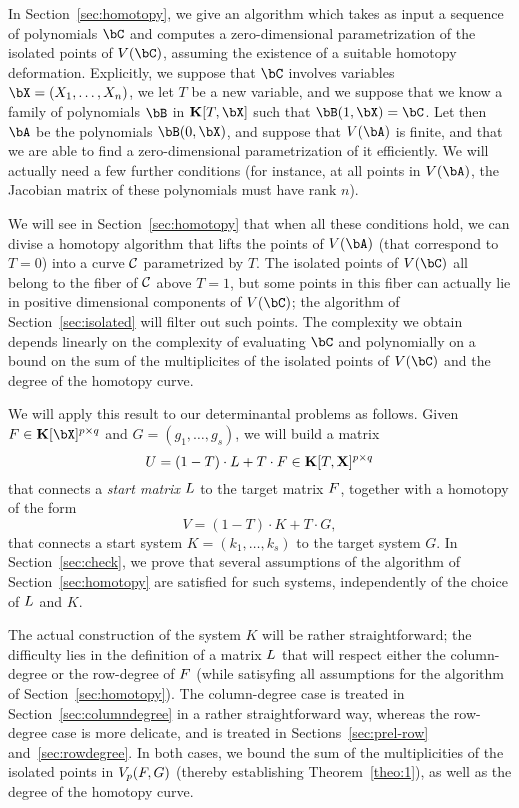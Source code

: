\documentclass[12pt]{article}
\begin{document}
In Section~\ref{sec:homotopy}, we give an algorithm which takes as
input a sequence of polynomials $\bC$ and computes a zero-dimensional
parametrization of the isolated points of $V(\bC)$, assuming the
existence of a suitable homotopy deformation. Explicitly, we suppose
that $\bC$ involves variables $\bX=(X_1,\dots,X_n)$, we let $T$ be a
new variable, and we suppose that we know a family of polynomials
$\bB$ in $\KK[T,\bX]$ such that $\bB(1,\bX)=\bC$. Let then $\bA$ be
the polynomials $\bB(0,\bX)$, and suppose that $V(\bA)$ is finite, and
that we are able to find a zero-dimensional parametrization of it
efficiently. We will actually need a few further conditions (for
instance, at all points in $V(\bA)$, the Jacobian matrix of these
polynomials must have rank $n$).

We will see in Section~\ref{sec:homotopy} that when all these
conditions hold, we can divise a homotopy algorithm that lifts the
points of $V(\bA)$ (that correspond to $T=0$) into a curve $\cal C$
parametrized by $T$. The isolated points of $V(\bC)$ all belong to the
fiber of $\cal C$ above $T=1$, but some points in this fiber can actually
lie in positive dimensional components of $V(\bC)$; the algorithm of
Section~\ref{sec:isolated} will filter out such points. The complexity
we obtain depends linearly on the complexity of evaluating $\bC$ and
polynomially on a bound on the sum of the multiplicites of the
isolated points of $V(\bC)$ and the degree of the homotopy curve.

We will apply this result to our determinantal problems as
follows. Given $\mF \in \KK[\bX]^{p \times q}$ and $G=(g_1,\dots,g_s)$,
we will build a matrix
\[{U} = (1-T)\cdot {L} + T \cdot {F} \in \mathbf{K}[T, \mathbf{X}]^{p \times q}\]
that connects a \emph{start matrix} ${L}$ to the target matrix ${F}$,
together with a homotopy of the form
\[V = (1-T) \cdot K + T \cdot G,\]
that connects a start system $K=(k_1,\dots,k_s)$ to the target system
$G$.  In Section~\ref{sec:check}, we prove that several assumptions of
the algorithm of Section~\ref{sec:homotopy} are satisfied for such
systems, independently of the choice of ${L}$ and $K$.

The actual construction of the system $K$ will be rather
straightforward; the difficulty lies in the definition of a matrix
${L}$ that will respect either the column-degree or the row-degree of
${F}$ (while satisyfing all assumptions for the algorithm of
Section~\ref{sec:homotopy}).  The column-degree case is treated in
Section~\ref{sec:columndegree} in a rather straightforward way,
whereas the row-degree case is more delicate, and is treated in
Sections~\ref{sec:prel-row} and~\ref{sec:rowdegree}. In both cases, we
bound the sum of the multiplicities of the isolated points in $V_{p}({F},G)$ (thereby establishing Theorem~\ref{theo:1}), as well as the
degree of the homotopy curve.
\end{document}
